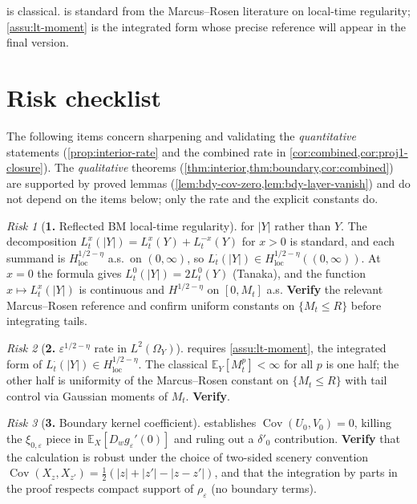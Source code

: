 \documentclass[11pt,reqno]{amsart}
\theoremstyle{plain}
\theoremstyle{definition}
\theoremstyle{remark}
\newtheorem*{risk}{Risk}
\newcommand{\E}{\mathbb{E}}
\DeclareMathOperator{\Cov}{Cov}
\begin{document}
 is classical.  is standard
from the Marcus--Rosen literature on local-time regularity;
\cref{assu:lt-moment} is the integrated form whose precise reference
will appear in the final version.

\section{Risk checklist}\label{sec:risks}

The following items concern sharpening and validating the
\emph{quantitative} statements (\cref{prop:interior-rate} and the
combined rate in \cref{cor:combined,cor:proj1-closure}). The
\emph{qualitative} theorems
(\cref{thm:interior,thm:boundary,cor:combined})
are supported by proved lemmas
(\cref{lem:bdy-cov-zero,lem:bdy-layer-vanish}) and do not depend on
the items below; only the rate and the explicit constants do.

\begin{risk}[\textbf{1.} Reflected BM local-time regularity]
\label{rsk:reflected-lt}
 for $|Y|$ rather than $Y$. The decomposition
$L_{t}^{x}(|Y|)=L_{t}^{x}(Y)+L_{t}^{-x}(Y)$ for $x>0$ is standard,
and each summand is $H^{1/2-\eta}_{\mathrm{loc}}$ a.s.\ on
$(0,\infty)$, so $L_{t}^{\cdot}(|Y|)\in H^{1/2-\eta}_{\mathrm{loc}}((0,\infty))$.
At $x=0$ the formula gives $L_{t}^{0}(|Y|)=2L_{t}^{0}(Y)$ (Tanaka),
and the function $x\mapsto L_{t}^{x}(|Y|)$ is continuous and
$H^{1/2-\eta}$ on $[0,M_{t}]$ a.s. \textbf{Verify} the relevant
Marcus--Rosen reference and confirm uniform constants on
$\{M_{t}\le R\}$ before integrating tails.
\end{risk}

\begin{risk}[\textbf{2.}
\texorpdfstring{$\varepsilon^{1/2-\eta}$}{epsilon\textasciicircum 1/2-eta} rate in
\texorpdfstring{$L^{2}(\Omega_{Y})$}{L\textasciicircum 2(Omega\_Y)}]
\label{rsk:rate-L2Y}
 requires \cref{assu:lt-moment}, the
integrated form of $L_{t}^{\cdot}(|Y|)\in H^{1/2-\eta}_{\mathrm{loc}}$.
The classical $\E_{Y}[M_{t}^{p}]<\infty$ for all $p$ is one half;
the other half is uniformity of the Marcus--Rosen constant on
$\{M_{t}\le R\}$ with tail control via Gaussian moments of $M_{t}$.
\textbf{Verify}.
\end{risk}

\begin{risk}[\textbf{3.} Boundary kernel coefficient]
\label{rsk:bdy-coefficient}
 establishes $\Cov(U_{0},V_{0})=0$, killing
the $\xi_{0,\varepsilon}$ piece in $\E_{X}[D_{w}g_{\varepsilon}'(0)]$
and ruling out a $\delta'_{0}$ contribution. \textbf{Verify} that
the calculation is robust under the choice of two-sided scenery
convention $\Cov(X_{z},X_{z'})=\tfrac12(|z|+|z'|-|z-z'|)$, and that
the integration by parts in the proof respects compact support of
$\rho_{\varepsilon}$ (no boundary terms).
\end{risk}
\end{document}

